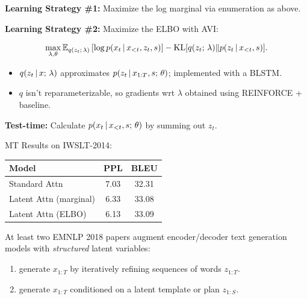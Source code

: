 \begin{frame}
\textbf{Learning Strategy \#1:} Maximize the log marginal via enumeration as above.

\air

\textbf{Learning Strategy \#2:} Maximize the ELBO with AVI:

\begin{align*}
    \max_{\lambda, \theta} \mathbb{E}_{q(z_t ; \, \lambda)} \left[ \log p(x_t \,|\, x_{<t}, z_t, s) \right] - \operatorname*{KL}[q(z_t ; \, \lambda) \Vert p(z_t \,|\, x_{<t}, s)].
\end{align*}

\air

\begin{itemize}
    \item $q(z_t \,|\, x ; \, \lambda)$ approximates $p(z_t \,|\, x_{1:T}, s ; \, \theta)$; implemented with a BLSTM.
    \item $q$ isn't reparameterizable, so gradients wrt $\lambda$ obtained using REINFORCE + baseline.
\end{itemize}

\end{frame}


\begin{frame}
\textbf{Test-time:} Calculate $p(x_t \,|\, x_{<t}, s ; \, \theta)$ by summing out $z_t$.

\air
\air
MT Results on IWSLT-2014:
\begin{table}
\begin{tabular}{lcc}
\toprule
     Model & PPL & BLEU\\
\midrule     
     Standard Attn & 7.03 & 32.31 \\
     Latent Attn (marginal) & 6.33 & 33.08 \\ 
     Latent Attn (ELBO) & 6.13 & 33.09 \\
\bottomrule
\end{tabular}
\end{table}
\end{frame}

\begin{frame}
At least two EMNLP 2018 papers augment encoder/decoder text generation models with \textit{structured} latent variables:

\begin{enumerate}
    \item \citet{lee2018deterministic} generate $x_{1:T}$ by iteratively refining sequences of words $z_{1:T}$.
    \air
    \air 
    \item \citet{wiseman2018learning} generate $x_{1:T}$ conditioned on a latent template or plan $z_{1:S}$.
\end{enumerate}
    
\end{frame}


